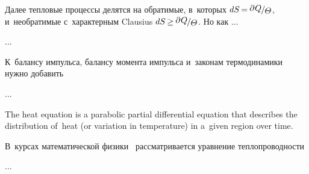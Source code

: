 \begin{otherlanguage}{russian}
Далее тепловые процессы делятся на обратимые, в~которых ${dS \hspace{-0.2ex} = \hspace{-0.1ex} \raisemath{.16em}{\partial\hspace{.1ex}Q} \hspace{-0.15ex} / \raisemath{-0.16em}{\hspace{-0.1ex} \temperaturefield}}$, и~необратимые с~характерным  Clausius ${dS \hspace{-0.2ex} \geq \hspace{-0.1ex} \raisemath{.16em}{\partial\hspace{.1ex}Q} \hspace{-0.15ex} / \raisemath{-0.16em}{\hspace{-0.1ex} \temperaturefield}}$.
Но как ...

...



\end{otherlanguage}



\begin{otherlanguage}{russian}

К~балансу импульса, балансу момента импульса и~законам термодинамики нужно добавить

...



\end{otherlanguage}



\begin{otherlanguage}{russian}

{\small
The heat equation is a parabolic partial differential equation that describes the distribution of~heat (or variation in temperature) in a~given region over time.
\par}

В~курсах математической физики~\cite{tihonovsamarsky-mathphysicsequations} рассматривается уравнение теплопроводности

...



\end{otherlanguage}

